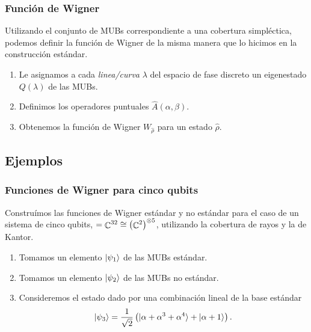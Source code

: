 \documentclass[10pt,spanish]{beamer}
\DeclareMathOperator{\C}{\mathbb{C}}
\let\H\relax
\DeclareMathOperator{\H}{\mathcal H}
\begin{document}
  \begin{frame}
    \frametitle{Función de Wigner}

    Utilizando el conjunto de MUBs correspondiente a una
    cobertura simpléctica, podemos definir la función de
    Wigner de la misma manera que lo hicimos en la
    construcción estándar.

    \vspace{15pt}

    \begin{enumerate}
      \item Le asignamos a cada \textit{linea/curva}
        $\lambda$ del espacio de fase discreto un
        eigenestado $Q(\lambda)$ de las MUBs.
      \item Definimos los operadores puntuales $\hat
        A(\alpha,\beta)$.
      \item Obtenemos la función de Wigner $W_{\hat\rho}$
        para un estado  $\hat\rho$.
    \end{enumerate}
  \end{frame}

  \subsection{Ejemplos}

  \begin{frame}
    \frametitle{Funciones de Wigner para cinco qubits}

    Construímos las funciones de Wigner estándar y no
    estándar para el caso de un sistema de cinco qubits, $\H
    = \C^{32} \cong \left( \C^2 \right)^{\otimes 5}$,
    utilizando la cobertura de rayos y la de Kantor.

    \vspace{5pt}

    \begin{enumerate}
      \item Tomamos un elemento $\ket{\psi_1}$ de las MUBs
        estándar.
      \item Tomamos un elemento $\ket{\psi_2}$ de las MUBs
        no estándar.
      \item Consideremos el estado dado por una combinación
        lineal de la base estándar
        \[
          \ket{\psi_3}
          = \frac{1}{\sqrt{2}} 
          \left( \ket{\alpha + \alpha^3 + \alpha^{4}} +
          \ket{\alpha+1} \right). 
        \]
    \end{enumerate}
  \end{frame}
\end{document}

